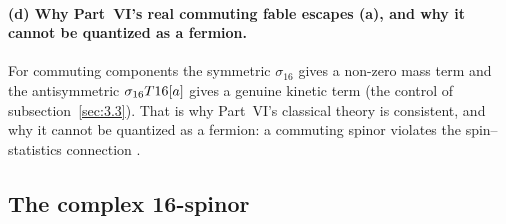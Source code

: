 \paragraph{(d) Why Part~VI's real commuting fable escapes (a), and why it cannot be quantized as a
fermion.} For commuting components the symmetric $\sigma_{16}$ gives a non-zero mass term and the
antisymmetric $\sigma_{16}T16[a]$ gives a genuine kinetic term (the control of
subsection~\ref{sec:3.3}). That is why Part~VI's classical theory is consistent, and why it cannot be
quantized as a fermion: a commuting spinor violates the spin--statistics connection
.

\subsection{The complex 16-spinor}
\label{sec:3.5}

